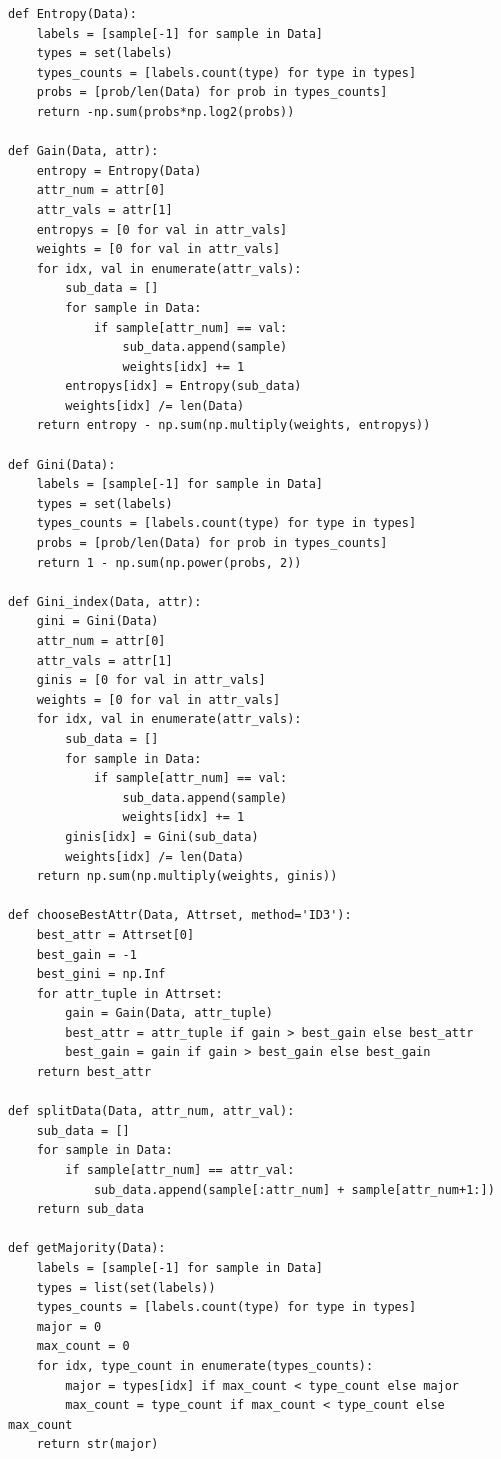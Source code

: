 \documentclass[a4paper, 11pt]{article}
\begin{document}
\begin{lstlisting}
def Entropy(Data):
    labels = [sample[-1] for sample in Data]
    types = set(labels)
    types_counts = [labels.count(type) for type in types]
    probs = [prob/len(Data) for prob in types_counts]
    return -np.sum(probs*np.log2(probs))

def Gain(Data, attr):
    entropy = Entropy(Data)
    attr_num = attr[0]
    attr_vals = attr[1]
    entropys = [0 for val in attr_vals]
    weights = [0 for val in attr_vals]
    for idx, val in enumerate(attr_vals):
        sub_data = []
        for sample in Data:
            if sample[attr_num] == val:
                sub_data.append(sample)
                weights[idx] += 1
        entropys[idx] = Entropy(sub_data)
        weights[idx] /= len(Data)
    return entropy - np.sum(np.multiply(weights, entropys))

def Gini(Data):
    labels = [sample[-1] for sample in Data]
    types = set(labels)
    types_counts = [labels.count(type) for type in types]
    probs = [prob/len(Data) for prob in types_counts]
    return 1 - np.sum(np.power(probs, 2))

def Gini_index(Data, attr):
    gini = Gini(Data)
    attr_num = attr[0]
    attr_vals = attr[1]
    ginis = [0 for val in attr_vals]
    weights = [0 for val in attr_vals]
    for idx, val in enumerate(attr_vals):
        sub_data = []
        for sample in Data:
            if sample[attr_num] == val:
                sub_data.append(sample)
                weights[idx] += 1
        ginis[idx] = Gini(sub_data)
        weights[idx] /= len(Data)
    return np.sum(np.multiply(weights, ginis))

def chooseBestAttr(Data, Attrset, method='ID3'):
    best_attr = Attrset[0]
    best_gain = -1
    best_gini = np.Inf
    for attr_tuple in Attrset:
        gain = Gain(Data, attr_tuple)
        best_attr = attr_tuple if gain > best_gain else best_attr
        best_gain = gain if gain > best_gain else best_gain
    return best_attr

def splitData(Data, attr_num, attr_val):
    sub_data = []
    for sample in Data:
        if sample[attr_num] == attr_val:
            sub_data.append(sample[:attr_num] + sample[attr_num+1:])
    return sub_data

def getMajority(Data):
    labels = [sample[-1] for sample in Data]
    types = list(set(labels))
    types_counts = [labels.count(type) for type in types]
    major = 0
    max_count = 0
    for idx, type_count in enumerate(types_counts):
        major = types[idx] if max_count < type_count else major
        max_count = type_count if max_count < type_count else max_count
    return str(major)


\end{lstlisting}
\end{document}

